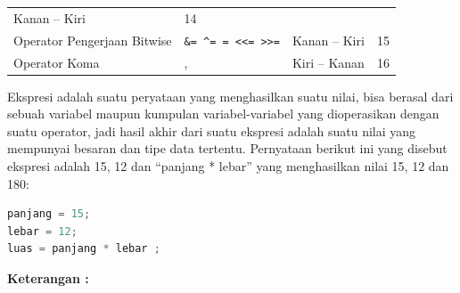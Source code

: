 \begin{longtable}[]{@{}llll@{}}
\begin{minipage}[t]{0.14\columnwidth}
Kanan -- Kiri
\strut\end{minipage} &
\begin{minipage}[t]{0.05\columnwidth}\raggedright\strut
14
\strut\end{minipage}\tabularnewline
\begin{minipage}[t]{0.52\columnwidth}\raggedright\strut
Operator Pengerjaan Bitwise
\strut\end{minipage} &
\begin{minipage}[t]{0.17\columnwidth}\raggedright\strut
\texttt{\&=\ \^{}=\ \textbar{}=\ \textless{}\textless{}=\ \textgreater{}\textgreater{}=}
\strut\end{minipage} &
\begin{minipage}[t]{0.14\columnwidth}\raggedright\strut
Kanan -- Kiri
\strut\end{minipage} &
\begin{minipage}[t]{0.05\columnwidth}\raggedright\strut
15
\strut\end{minipage}\tabularnewline
\begin{minipage}[t]{0.52\columnwidth}\raggedright\strut
Operator Koma
\strut\end{minipage} &
\begin{minipage}[t]{0.17\columnwidth}\raggedright\strut
,
\strut\end{minipage} &
\begin{minipage}[t]{0.14\columnwidth}\raggedright\strut
Kiri -- Kanan
\strut\end{minipage} &
\begin{minipage}[t]{0.05\columnwidth}\raggedright\strut
16
\strut\end{minipage}\tabularnewline
\bottomrule
\end{longtable}

Ekspresi adalah suatu peryataan yang menghasilkan suatu nilai, bisa
berasal dari sebuah variabel maupun kumpulan variabel-variabel yang
dioperasikan dengan suatu operator, jadi hasil akhir dari suatu ekspresi
adalah suatu nilai yang mempunyai besaran dan tipe data tertentu.
Pernyataan berikut ini yang disebut ekspresi adalah 15, 12 dan ``panjang
* lebar'' yang menghasilkan nilai 15, 12 dan 180:

\begin{lstlisting}[language=c++, numbers=none]
panjang = 15;
lebar = 12;
luas = panjang * lebar ;
\end{lstlisting}

\textbf{Keterangan :}

